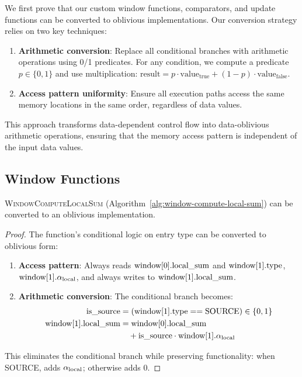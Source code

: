 We first prove that our custom window functions, comparators, and update functions can be converted to oblivious implementations. Our conversion strategy relies on two key techniques:

\begin{enumerate}
\item \textbf{Arithmetic conversion}: Replace all conditional branches with arithmetic operations using 0/1 predicates. For any condition, we compute a predicate $p \in \{0,1\}$ and use multiplication: $\text{result} = p \cdot \text{value}_{\text{true}} + (1-p) \cdot \text{value}_{\text{false}}$.

\item \textbf{Access pattern uniformity}: Ensure all execution paths access the same memory locations in the same order, regardless of data values.
\end{enumerate}

This approach transforms data-dependent control flow into data-oblivious arithmetic operations, ensuring that the memory access pattern is independent of the input data values.

\subsection{Window Functions}

\begin{lemma}
\label{lem:window-local-sum}
\textsc{WindowComputeLocalSum} (Algorithm~\ref{alg:window-compute-local-sum}) can be converted to an oblivious implementation.
\end{lemma}

\begin{proof}
The function's conditional logic on entry type can be converted to oblivious form:
\begin{enumerate}
\item \textbf{Access pattern}: Always reads $\text{window}[0].\text{local\_sum}$ and $\text{window}[1].\text{type}$, $\text{window}[1].\alpha_{\text{local}}$, and always writes to $\text{window}[1].\text{local\_sum}$.
\item \textbf{Arithmetic conversion}: The conditional branch becomes:
\begin{align}
\text{is\_source} &= (\text{window}[1].\text{type} == \text{SOURCE}) \in \{0,1\} \nonumber \\
\text{window}[1].\text{local\_sum} &= \text{window}[0].\text{local\_sum} \nonumber \\
&\quad + \text{is\_source} \cdot \text{window}[1].\alpha_{\text{local}} \nonumber
\end{align}
\end{enumerate}
This eliminates the conditional branch while preserving functionality: when SOURCE, adds $\alpha_{\text{local}}$; otherwise adds 0.
\end{proof}

